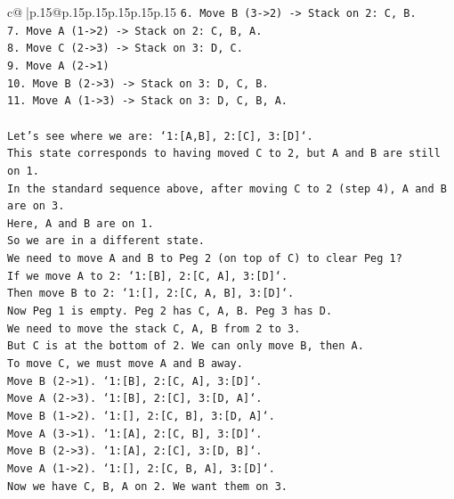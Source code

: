 \documentclass{article}
\begin{document}
{\begin{supertabular}{c@{$\;$}|p{.15\linewidth}@{}p{.15\linewidth}p{.15\linewidth}p{.15\linewidth}p{.15\linewidth}p{.15\linewidth}}
{{{\texttt{6. Move B (3{-}>2) {-}> Stack on 2: C, B.} \\
\texttt{7. Move A (1{-}>2) {-}> Stack on 2: C, B, A.} \\
\texttt{8. Move C (2{-}>3) {-}> Stack on 3: D, C.} \\
\texttt{9. Move A (2{-}>1)} \\
\texttt{10. Move B (2{-}>3) {-}> Stack on 3: D, C, B.} \\
\texttt{11. Move A (1{-}>3) {-}> Stack on 3: D, C, B, A.} \\
\\ 
\texttt{Let's see where we are: `1:{[}A,B{]}, 2:{[}C{]}, 3:{[}D{]}`.} \\
\texttt{This state corresponds to having moved C to 2, but A and B are still on 1.} \\
\texttt{In the standard sequence above, after moving C to 2 (step 4), A and B are on 3.} \\
\texttt{Here, A and B are on 1.} \\
\texttt{So we are in a different state.} \\
\texttt{We need to move A and B to Peg 2 (on top of C) to clear Peg 1?} \\
\texttt{If we move A to 2: `1:{[}B{]}, 2:{[}C, A{]}, 3:{[}D{]}`.} \\
\texttt{Then move B to 2: `1:{[}{]}, 2:{[}C, A, B{]}, 3:{[}D{]}`.} \\
\texttt{Now Peg 1 is empty. Peg 2 has C, A, B. Peg 3 has D.} \\
\texttt{We need to move the stack C, A, B from 2 to 3.} \\
\texttt{But C is at the bottom of 2. We can only move B, then A.} \\
\texttt{To move C, we must move A and B away.} \\
\texttt{Move B (2{-}>1). `1:{[}B{]}, 2:{[}C, A{]}, 3:{[}D{]}`.} \\
\texttt{Move A (2{-}>3). `1:{[}B{]}, 2:{[}C{]}, 3:{[}D, A{]}`.} \\
\texttt{Move B (1{-}>2). `1:{[}{]}, 2:{[}C, B{]}, 3:{[}D, A{]}`.} \\
\texttt{Move A (3{-}>1). `1:{[}A{]}, 2:{[}C, B{]}, 3:{[}D{]}`.} \\
\texttt{Move B (2{-}>3). `1:{[}A{]}, 2:{[}C{]}, 3:{[}D, B{]}`.} \\
\texttt{Move A (1{-}>2). `1:{[}{]}, 2:{[}C, B, A{]}, 3:{[}D{]}`.} \\
\texttt{Now we have C, B, A on 2. We want them on 3.} \\
}}}
\end{supertabular}}
\end{document}
